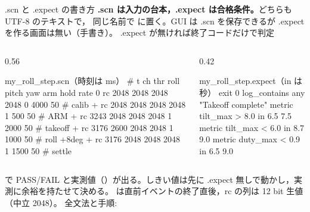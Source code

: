 \begin{frame}[fragile]{.scn と .expect の書き方\later}
  {\scriptsize \textbf{.scn は入力の台本，.expect は合格条件。}どちらも UTF-8 のテキストで，
  同じ名前で  に置く。GUI は .scn を保存できるが .expect を作る画面は無い（手書き）。
  .expect が無ければ終了コードだけで判定}

  \vspace{-0.2em}
  \begin{columns}[T]
    \begin{column}{0.56\textwidth}
      \begin{sflisting}[basicstyle=\ttfamily\tiny]{my\_roll\_step.scn（時刻は ms）}
# t  ch  thr  roll pitch yaw  arm hold rate
  0  rc  2048 2048 2048 2048  0   4000 50   # calib
  +  rc  2048 2048 2048 2048  1   500  50   # ARM
  +  rc  3243 2048 2048 2048  1   2000 50   # takeoff
  +  rc  3176 2600 2048 2048  1   1000 50   # roll +8deg
  +  rc  3176 2048 2048 2048  1   1500 50   # settle
      \end{sflisting}
    \end{column}
    \begin{column}{0.42\textwidth}
      \begin{sflisting}[basicstyle=\ttfamily\tiny]{my\_roll\_step.expect（in は秒）}
exit 0
log_contains any "Takeoff complete"
metric tilt_max > 8.0 in 6.5 7.5
metric tilt_max < 6.0 in 8.7 9.0
metric duty_max < 0.9 in 6.5 9.0
      \end{sflisting}
    \end{column}
  \end{columns}

  \vspace{-0.3em}
  {\scriptsize {} で
  PASS/FAIL と実測値（）が出る。しきい値は先に .expect 無しで動かし，実測に余裕を持たせて決める。
  \code{+} は直前イベントの終了直後，rc の列は 12 bit 生値（中立 2048）。
  全文法と手順: }
\end{frame}

